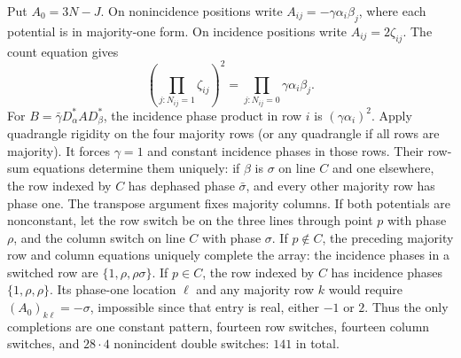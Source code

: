 Put $A_0=3N-J$. On nonincidence positions write $A_{ij}=-\gamma\alpha_i\beta_j$, where each potential is in majority-one form. On incidence positions write $A_{ij}=2\zeta_{ij}$. The count equation gives
\[\left(\prod_{j:N_{ij}=1}\zeta_{ij}\right)^2=\prod_{j:N_{ij}=0}\gamma\alpha_i\beta_j.\]
For $B=\bar\gamma D_\alpha^*AD_\beta^*$, the incidence phase product in row $i$ is $(\gamma\alpha_i)^2$. Apply quadrangle rigidity on the four majority rows (or any quadrangle if all rows are majority). It forces $\gamma=1$ and constant incidence phases in those rows. Their row-sum equations determine them uniquely: if $\beta$ is $\sigma$ on line $C$ and one elsewhere, the row indexed by $C$ has dephased phase $\bar\sigma$, and every other majority row has phase one. The transpose argument fixes majority columns.
If both potentials are nonconstant, let the row switch be on the three lines through point $p$ with phase $\rho$, and the column switch on line $C$ with phase $\sigma$. If $p\notin C$, the preceding majority row and column equations uniquely complete the array: the incidence phases in a switched row are $\{1,\rho,\rho\sigma\}$. If $p\in C$, the row indexed by $C$ has incidence phases $\{1,\rho,\rho\}$. Its phase-one location $\ell$ and any majority row $k$ would require $(A_0)_{k\ell}=-\sigma$, impossible since that entry is real, either $-1$ or $2$.
Thus the only completions are one constant pattern, fourteen row switches, fourteen column switches, and $28\cdot4$ nonincident double switches: $141$ in total.

